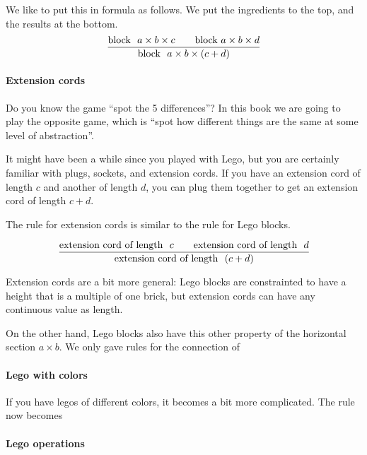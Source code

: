 We like to put this in formula as follows. We put the ingredients to the top, and the results at the bottom.
%
\begin{equation}
  \frac{\text{block }\ a \times b \times c \qquad\text{block}\ a \times b \times d }{%
    \text{block }\ a \times b \times (c+d)%
  }
\end{equation}

\paragraph{Extension cords}

Do you know the game ``spot the 5 differences''? In this book we are going to play the opposite game, which
is ``spot how different things are the same at some level of abstraction''.

It might have been a while
since you played with Lego, but you are certainly familiar with plugs, sockets, and extension cords.
If you have an extension cord of length $c$ and another of length $d$, you can plug them together to get an extension cord of length $c+d$.



The rule for extension cords is similar to the rule for Lego blocks.

\begin{equation}
  \frac{\text{extension cord of length }\ c \qquad \text{extension cord of length }\ d }{%
    \text{extension cord of length }\ (c+d)%
  }
\end{equation}

Extension cords are a bit more general: Lego blocks are constrainted to have a height that is a multiple of one brick,  but extension cords can have any continuous value as length.

On the other hand, Lego blocks also have this other property of the horizontal section $a \times b$. We only gave rules for the connection of



\paragraph{Lego with colors}

If you have legos of different colors, it becomes a bit more complicated. The rule now becomes


\paragraph{Lego operations}

